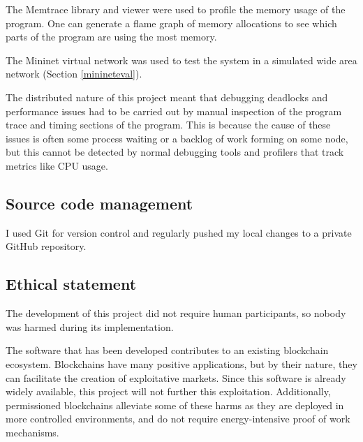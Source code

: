 The Memtrace library and viewer \cite{memtrace} were used to profile the memory usage of the program. One can generate a flame graph of memory allocations to see which parts of the program are using the most memory.

The Mininet virtual network \cite{mininet,lantzNetworkLaptopRapid2010} was used to test the system in a simulated wide area network (Section \ref{minineteval}).

The distributed nature of this project meant that debugging deadlocks and performance issues had to be carried out by manual inspection of the program trace and timing sections of the program. This is because the cause of these issues is often some process waiting or a backlog of work forming on some node, but this cannot be detected by normal debugging tools and profilers that track metrics like CPU usage.

\subsection{Source code management}
I used Git for version control and regularly pushed my local changes to a private GitHub repository.

\subsection{Ethical statement}
The development of this project did not require human participants, so nobody was harmed during its implementation.

The software that has been developed contributes to an existing blockchain ecosystem. Blockchains have many positive applications, but by their nature, they can facilitate the creation of exploitative markets. Since this software is already widely available, this project will not further this exploitation. Additionally, permissioned blockchains alleviate some of these harms as they are deployed in more controlled environments, and do not require energy-intensive proof of work mechanisms.